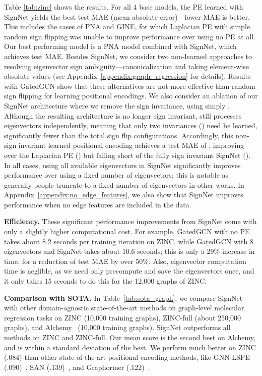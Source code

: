 \documentclass{article} \usepackage{iclr2023_conference,times}
\begin{document}
Table \ref{tab:zinc} shows the results. For all 4 base models, the PE learned with SignNet yields the best test MAE (mean absolute error)---lower MAE is better. This includes the cases of PNA and GINE, for which Laplacian PE with simple random sign flipping was unable to improve performance over using no PE at all. Our best performing model is a PNA model combined with SignNet, which achieves  test MAE. Besides SignNet, we consider two non-learned approaches to resolving eigenvector sign ambiguity---canonicalization and taking element-wise absolute values (see Appendix~\ref{appendix:graph_regression} for details). Results with GatedGCN show that these alternatives are not more effective than random sign flipping for learning positional encodings. We also consider an ablation of our SignNet architecture where we remove the sign invariance, using simply . Although the resulting architecture is no longer sign invariant,  still processes eigenvectors independently, meaning that only two invariances () need be learned, significantly fewer than the  total sign flip configurations. Accordingly, this non-sign invariant learned positional encoding achieves a test MAE of , improving over the Laplacian PE () but falling short of the fully sign invariant SignNet (). In all cases, using all available eigenvectors in SignNet significantly improves performance over using a fixed number of eigenvectors; this is notable as generally people truncate to a fixed number of eigenvectors in other works.
In Appendix~\ref{appendix:no_edge_features}, we also show that SignNet improves performance when no edge features are included in the data.

\textbf{Efficiency.} These significant performance improvements from SignNet come with only a slightly higher computational cost. For example, GatedGCN with no PE takes about 8.2 seconds per training iteration on ZINC, while GatedGCN with 8 eigenvectors and SignNet takes about 10.6 seconds; this is only a 29\% increase in time, for a reduction of test MAE by over 50\%. Also, eigenvector computation time is neglible, as we need only precompute and save the eigenvectors once, and it only takes 15 seconds to do this for the 12,000 graphs of ZINC.

\textbf{Comparison with SOTA.} In Table~\ref{tab:sota_graph}, we compare SignNet with other domain-agnostic state-of-the-art methods on graph-level molecular regression tasks on ZINC (10,000 training graphs), ZINC-full (about 250,000 graphs), and Alchemy~\citep{chen2019alchemy} (10,000 training graphs).
SignNet outperforms all methods on ZINC and ZINC-full.
Our mean score is the second best on Alchemy, and is within a standard deviation of the best.
We perform much better on ZINC (.084) than other state-of-the-art positional encoding methods, like GNN-LSPE (.090)~\citep{dwivedi2022graph}, SAN (.139)~\citep{kreuzer2021rethinking}, and Graphormer (.122)~\citep{ying2021transformers}.
\end{document}
